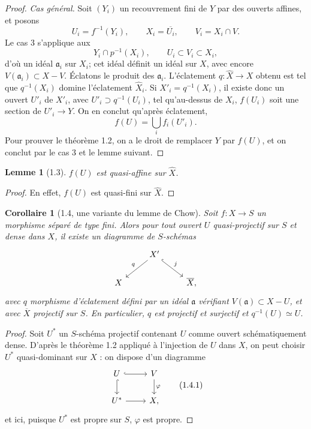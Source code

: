 \documentclass[11pt]{article}
\newtheorem*{lemma}{Lemme}
\newtheorem*{corollary}{Corollaire}
\newcommand{\wh}[1]{\widehat{#1}}
\begin{document}
\begin{proof}
\emph{Cas général.} Soit \((Y_i)\) un recouvrement fini de \(Y\) par des ouverts affines, et posons
\[
U_i=f^{-1}(Y_i),\qquad X_i=\overline{U_i},\qquad V_i=X_i\cap V.
\]
Le cas 3 s'applique aux
\[
Y_i\cap p^{-1}(X_i),\qquad U_i\subset V_i\subset X_i,
\]
d'où un idéal \(\mathfrak a_i\) sur \(X_i\); cet idéal définit un idéal sur \(X\), avec encore \(V(\mathfrak a_i)\subset X-V\). Éclatons le produit des \(\mathfrak a_i\). L'éclatement \(q:\wh X\to X\) obtenu est tel que \(q^{-1}(X_i)\) domine l'éclatement \(\wh X_i\). Si \(X'_i=q^{-1}(X_i)\), il existe donc un ouvert \(U'_i\) de \(X'_i\), avec \(U'_i\supset q^{-1}(U_i)\), tel qu'au-dessus de \(X_i\), \(f(U_i)\) soit une section de \(U'_i\to Y\). On en conclut qu'après éclatement,
\[
f(U)=\bigcup_i f_i(U'_i).
\]
Pour prouver le théorème 1.2, on a le droit de remplacer \(Y\) par \(f(U)\), et on conclut par le cas 3 et le lemme suivant.
\end{proof}

\begin{lemma}[1.3]
\(f(U)\) est quasi-affine sur \(\wh X\).
\end{lemma}
\begin{proof}
En effet, \(f(U)\) est quasi-fini sur \(\wh X\).
\end{proof}

\begin{corollary}[1.4, une variante du lemme de Chow]
Soit \(f:X\to S\) un morphisme séparé de type fini. Alors pour tout ouvert \(U\) quasi-projectif sur \(S\) et dense dans \(X\), il existe un diagramme de \(S\)-schémas
\[
\begin{tikzcd}
& X' \ar[dl,"q"'] \ar[dr,hook,"j"] & \\
X && \overline X,
\end{tikzcd}
\]
avec \(q\) morphisme d'éclatement défini par un idéal \(\mathfrak a\) vérifiant \(V(\mathfrak a)\subset X-U\), et avec \(\overline X\) projectif sur \(S\). En particulier, \(q\) est projectif et surjectif et \(q^{-1}(U)\simeq U\).
\end{corollary}

\begin{proof}
Soit \(U^*\) un \(S\)-schéma projectif contenant \(U\) comme ouvert schématiquement dense. D'après le théorème 1.2 appliqué à l'injection de \(U\) dans \(X\), on peut choisir \(U^*\) quasi-dominant sur \(X\) : on dispose d'un diagramme
\[
\begin{tikzcd}
U \ar[r,hook] \ar[d,hook] & V \ar[d,"\varphi"] \\
U^* \ar[r] & X,
\end{tikzcd}
\tag{1.4.1}
\]
et ici, puisque \(U^*\) est propre sur \(S\), \(\varphi\) est propre.
\end{proof}
\end{document}
